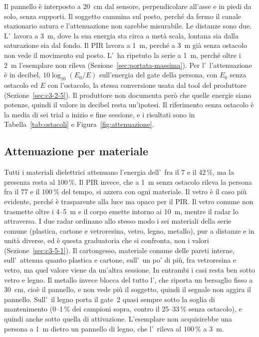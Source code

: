 Il pannello è interposto a 20~cm dal sensore, perpendicolare all'asse e in piedi da solo, senza supporti. Il soggetto cammina sul posto, perché da fermo il canale stazionario satura e l'attenuazione non sarebbe misurabile. Le distanze sono due. L'\ldb\ lavora a 3~m, dove la sua energia sta circa a metà scala, lontana sia dalla saturazione sia dal fondo. Il PIR lavora a 1~m, perché a 3~m già senza ostacolo non vede il movimento sul posto. L'\ldc\ ha ripetuto la serie a 1~m, perché oltre i 2~m l'esemplare non rileva (Sezione~\ref{sec:portata-massima}). Per l'\ldc\ l'attenuazione è in decibel, $10\log_{10}(E_0/E)$ sull'energia del gate della persona, con $E_0$ senza ostacolo ed $E$ con l'ostacolo, la stessa conversione usata dal tool del produttore (Sezione~\ref{sec:c3-2-5}). Il produttore non documenta però che quelle energie siano potenze, quindi il valore in decibel resta un'ipotesi. Il riferimento senza ostacolo è la media di sei trial a inizio e fine sessione, e i risultati sono in Tabella~\ref{tab:ostacoli} e Figura~\ref{fig:attenuazione}.

\subsection{Attenuazione per materiale}
\label{sec:ostacoli-materiali}
\label{sec:ld2420-attenuazione}

Tutti i materiali dielettrici attenuano l'energia dell'\ldb\ fra il 7 e il 42\,\%, ma la presenza resta al 100\,\%. Il PIR invece, che a 1~m senza ostacolo rileva la persona fra il 77 e il 100\,\% del tempo, si azzera con ogni materiale. Il vetro è il caso più evidente, perché è trasparente alla luce ma opaco per il PIR. Il vetro comune non trasmette oltre i 4--5~\textmu m e il corpo emette intorno ai 10~\textmu m, mentre il radar lo attraversa. I due radar ordinano allo stesso modo i sei materiali della serie comune (plastica, cartone e vetroresina, vetro, legno, metallo), pur a distanze e in unità diverse, ed è questa graduatoria che si confronta, non i valori (Sezione~\ref{sec:c3-5-1}). Il cartongesso, materiale comune delle pareti interne, sull'\ldc\ attenua quanto plastica e cartone, sull'\ldb\ un po' di più, fra vetroresina e vetro, ma quel valore viene da un'altra sessione. In entrambi i casi resta ben sotto vetro e legno. Il metallo invece blocca del tutto l'\ldb, che riporta un bersaglio fisso a 30~cm, cioè il pannello, e non vede più il soggetto, quindi il segnale non aggira il pannello. Sull'\ldc\ il legno porta il gate~2 quasi sempre sotto la soglia di mantenimento (0--1\,\% dei campioni sopra, contro il 25--33\,\% senza ostacolo), e quindi anche sotto quella di attivazione. L'esemplare non acquisirebbe una persona a 1~m dietro un pannello di legno, che l'\ldb\ rileva al 100\,\% a 3~m.

